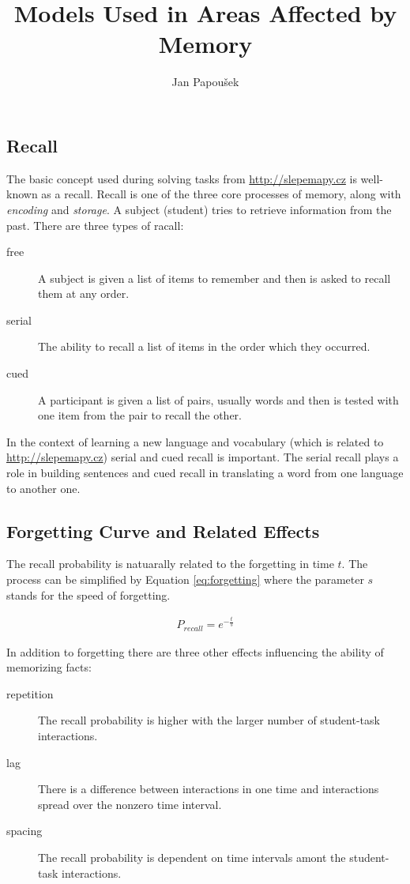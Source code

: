 \documentclass[a4paper]{article}
\title{Models Used in Areas Affected by Memory}
\author{Jan Papou\v{s}ek}
\begin{document}
\maketitle

\subsection{Recall}

The basic concept used during solving tasks from \url{http://slepemapy.cz} is well-known as a recall.
Recall is one of the three core processes of memory, along with \textit{encoding} and \textit{storage}. A subject (student)
tries to retrieve information from the past. There are three types of racall:

\begin{description}
	\item[free]		A subject is given a list of items to remember and then is asked to recall
								them at any order.
	\item[serial] The ability to recall a list of items in the order which they occurred.
	\item[cued]		A participant is given a list of pairs, usually words and then is tested
								with one item	from the pair to recall the other.
\end{description}

In the context of learning a new language and vocabulary (which is related to \url{http://slepemapy.cz})
serial and cued recall is important. The serial recall plays a role in building sentences and cued
recall in translating a word from one language to another one.

\subsection{Forgetting Curve and Related Effects}

The recall probability is natuarally related to the forgetting in time $t$. The process can be
simplified by Equation \ref{eq:forgetting} where the parameter $s$ stands for the speed of forgetting.

\begin{align}
\label{eq:forgetting}
P_{recall} = e^{-\frac{t}{s}}
\end{align}

In addition to forgetting there are three other effects influencing the ability of memorizing facts:

\begin{description}
	\item[repetition] The recall probability is higher with the larger number of student-task
										interactions.
	\item[lag]	There is a difference between interactions in one time and interactions spread over
							the nonzero time interval.
	\item[spacing]	The recall probability is dependent on time intervals amont the student-task
									interactions.
\end{description}
\end{document}

